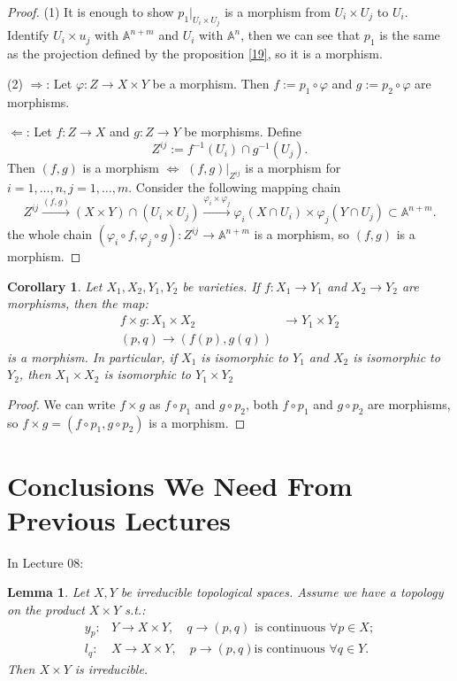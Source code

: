 \documentclass{amsart}
\theoremstyle{plain}
\newtheorem{corollary}{Corollary}
\newtheorem{lemma}{Lemma}
\theoremstyle{definition}
\theoremstyle{remark}
\numberwithin{equation}{section}
\begin{document}
\begin{proof}
	(1) It is enough to show $ p_1|_{U_i\times U_j} $ is a morphism from $ U_i\times U_j $ to $ U_i $. Identify $ U_i\times u_j $ with $ \mathbb{A}^{n+m} $ and $ U_i $ with $ \mathbb{A}^{n} $, then we can see that $ p_1 $ is the same as  the projection defined by the proposition \ref{19}, so it is a morphism.
	
	(2) $ \Rightarrow $: Let $ \varphi:Z\to X\times Y $ be a morphism. Then $ f:=p_1\circ \varphi $ and $ g:=p_2\circ \varphi $ are morphisms.
	
	$ \Leftarrow $: Let $ f:Z\to X $ and $ g:Z\to Y $ be morphisms. Define
	$$
	Z^{ij}:=f^{-1}(U_i)\cap g^{-1}(U_j).
	$$
	Then $ (f,g) $ is a morphism $ \Leftrightarrow $ $ (f,g)|_{Z^{ij}} $ is a morphism for $ i=1,\dots,n,j=1,\dots,m $. Consider the following mapping chain
	$$
	Z^{ij}\xrightarrow{(f,g)} (X\times Y)\cap (U_i\times U_j)\xrightarrow{\varphi_i\times \varphi_j}\varphi_i(X\cap U_i)\times \varphi_j(Y\cap U_j)\subset \mathbb{A}^{n+m}.
	$$
	the whole chain $ (\varphi_i\circ f,\varphi_j\circ g):Z^{ij}\to \mathbb{A}^{n+m} $ is a morphism, so $ (f,g) $ is a morphism.
\end{proof}
\begin{corollary}
	Let $ X_1,X_2,Y_1,Y_2 $ be varieties. If $ f:X_1\to Y_1 $ and $ X_2\to Y_2 $ are morphisms, then the map:
	$$\begin{array}{cc}
	f\times g :X_1\times X_2 & \to Y_1\times Y_2\\
	(p,q)\to (f(p),g(q))
	\end{array}$$
	is a morphism. In particular, if $ X_1 $ is isomorphic to $ Y_1 $ and $ X_2 $ is isomorphic to $ Y_2 $, then $ X_1\times X_2 $ is isomorphic to $ Y_1\times Y_2 $
\end{corollary}
\begin{proof}
	We can write $ f\times g $ as $ f\circ p_1 $ and $ g\circ p_2 $, both $ f\circ p_1 $ and $ g\circ p_2 $ are morphisms, so $ f\times g =(f\circ p_1,g\circ p_2) $ is a morphism.
\end{proof} 
\section{Conclusions We Need From Previous Lectures}
In Lecture 08:
\begin{lemma}\label{16}
	Let $ X,Y $ be irreducible topological spaces. Assume we have a topology on the product $ X\times Y $ s.t.:
	$$\begin{array}{cc}
	y_p: & Y\to X\times Y, \quad q\to (p,q) \text{ is continuous }\forall p\in X;\\
	l_q: & X\to X\times Y, \quad p\to (p,q) \text{is continuous }\forall q\in Y.
	\end{array}$$
	Then $ X\times Y $ is irreducible.
	\end{lemma}
	
\end{document}
